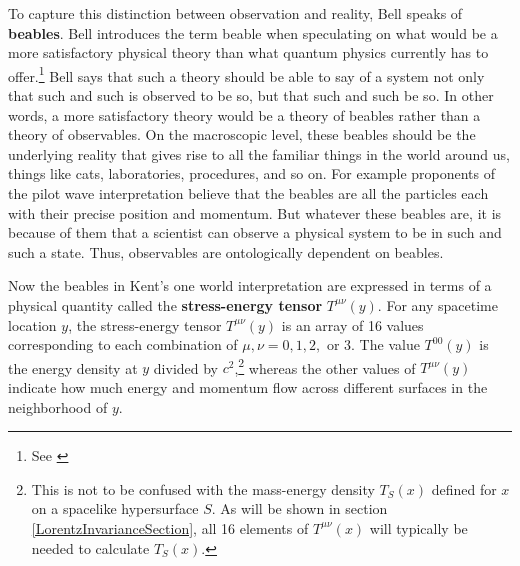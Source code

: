 To capture this distinction between observation and reality, Bell speaks of \textbf{beables}.\label{beabledef} Bell introduces the term beable when speculating on what would be a more satisfactory physical theory than what quantum physics currently has to offer.\footnote{See \cite{Bell2}} Bell says that such a theory should be able to say of a system not only that such and such is observed to be so, but that such and such be so. In other words, a more satisfactory theory would be a theory of beables rather than a theory of observables. On the macroscopic level, these beables should be the underlying reality that gives rise to all the familiar things in the world around us, things like cats, laboratories, procedures, and so on. For example proponents of the pilot wave interpretation believe that the beables are all the particles each with their precise position and momentum. But whatever these beables are, it is because of them that a scientist can observe a physical system to be in such and such a state. Thus, observables are ontologically dependent on beables.   

Now the beables in Kent's one world interpretation are expressed in terms of a physical quantity called the \textbf{stress-energy tensor}  $T^{\mu\nu}(y)$.\label{stressenergy}  For any spacetime location $y$, the stress-energy tensor $T^{\mu\nu}(y)$ is an array of 16 values corresponding to each combination of $\mu, \nu=0,1,2,$ or $3$. The value $T^{00}(y)$ is the energy density at $y$ divided by $c^2$,\footnote{This is not to be confused with the mass-energy density $T_S(x)$ defined for $x$ on a spacelike hypersurface $S$. As will be shown in section \ref{LorentzInvarianceSection},   all 16 elements of $T^{\mu\nu}(x)$ will typically be needed to calculate $T_S(x)$.} whereas the other values of $T^{\mu\nu}(y)$ indicate how much energy and momentum flow across different surfaces in the neighborhood of $y$. 

